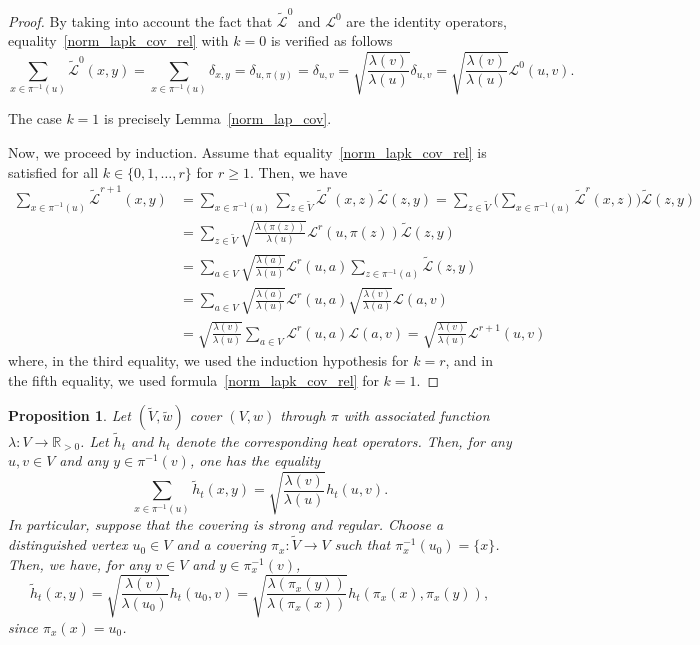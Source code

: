 \documentclass[11pt]{amsart}
\newcommand{\R}{\mathbb{R}}
\theoremstyle{definition}
\theoremstyle{remark}
\theoremstyle{plain}
\newtheorem{proposition}{Proposition}
\numberwithin{equation}{section}
\numberwithin{lemma}{section}
\numberwithin{definition}{section}
\numberwithin{proposition}{section}
\numberwithin{corollary}{section}
\numberwithin{theorem}{section}
\numberwithin{remark}{section}
\begin{document}
\begin{proof}
By taking into account the fact that $\tilde{\mathcal{L}}^0$ and $\mathcal{L}^0$ are the identity operators, equality~\eqref{norm_lapk_cov_rel} with $k=0$ is verified as follows
$$
 \sum_{x\in\pi^{-1}(u)} \tilde{\mathcal{L}}^0(x,y) = \sum_{x\in\pi^{-1}(u)}\delta_{x,y}=\delta_{u,\pi(y)}=\delta_{u,v} =\sqrt{\frac{\lambda(v)}{\lambda(u)}}\delta_{u,v}=\sqrt{\frac{\lambda(v)}{\lambda(u)}} \mathcal{L}^0(u,v).
$$

The case $k=1$ is precisely Lemma~\ref{norm_lap_cov}.


Now, we proceed by induction. Assume that equality~\eqref{norm_lapk_cov_rel} is satisfied for all $k\in\{0,1,\dots,r\}$ for $r\ge1$. Then, we have
\begin{align*}
 \sum_{x\in\pi^{-1}(u)} \tilde{\mathcal{L}}^{r+1}(x,y) & = \sum_{x\in\pi^{-1}(u)}\sum_{z\in\tilde V} \tilde{\mathcal{L}}^{r}(x,z) \tilde{\mathcal{L}}(z,y) 
  = \sum_{z\in\tilde V}\Big(\sum_{x\in\pi^{-1}(u)} \tilde{\mathcal{L}}^{r}(x,z)\Big) \tilde{\mathcal{L}}(z,y)\\
 & = \sum_{z\in\tilde V}\sqrt{\frac{\lambda(\pi(z))}{\lambda(u)}} \mathcal{L}^r(u,\pi(z)) \tilde{\mathcal{L}}(z,y) \\
 & = \sum_{a\in V}\sqrt{\frac{\lambda(a)}{\lambda(u)}} \mathcal{L}^r(u,a)\sum_{z\in\pi^{-1}(a)} \tilde{\mathcal{L}}(z,y) \\
 & = \sum_{a\in V}\sqrt{\frac{\lambda(a)}{\lambda(u)}}\mathcal{L}^r(u,a)\sqrt{\frac{\lambda(v)}{\lambda(a)}}\mathcal{L}(a,v)\\
 & = \sqrt{\frac{\lambda(v)}{\lambda(u)}}\sum_{a\in V}\mathcal{L}^r(u,a)\mathcal{L}(a,v)
  = \sqrt{\frac{\lambda(v)}{\lambda(u)}}\mathcal{L}^{r+1}(u,v)
\end{align*}
where, 
in the third equality, we used the induction hypothesis for $k=r$,
and in the fifth equality, we used formula~\eqref{norm_lapk_cov_rel} for $k=1$.
\end{proof}

\begin{proposition} \label{rel_covering_heat_kernel}
Let $(\tilde{V},\tilde{w})$ cover $(V,w)$ through $\pi$ with associated function $\lambda: V \to \R_{>0}$. Let $\tilde{h}_t$ and $h_t$ denote the corresponding heat operators.
 Then, for any $u,v\in V$ and any $y\in\pi^{-1}(v)$, one has the equality
\begin{equation}\label{eq5}
\sum_{x\in\pi^{-1}(u)}\tilde{h}_t(x,y)=\sqrt{\frac{\lambda(v)}{\lambda(u)}}h_t(u,v).
\end{equation}
In particular, suppose that the covering is strong and regular. Choose a distinguished vertex $u_0\in V$ and a covering 
$\pi_x\colon\tilde{V}\to V$ such that $\pi_x^{-1}(u_0)=\{x\}$. Then, we have, for any $v\in V$ and $y\in\pi_x^{-1}(v)$,
 \begin{equation}\label{new_hk}
 \tilde{h}_t(x,y)=\sqrt{\frac{\lambda(v)}{\lambda(u_0)}}h_t(u_0,v)=\sqrt{\frac{\lambda(\pi_x(y))}{\lambda(\pi_x(x))}}h_t(\pi_x(x),\pi_x(y)),
 \end{equation}
 since $\pi_x(x)=u_0$.
\end{proposition}
\end{document}
